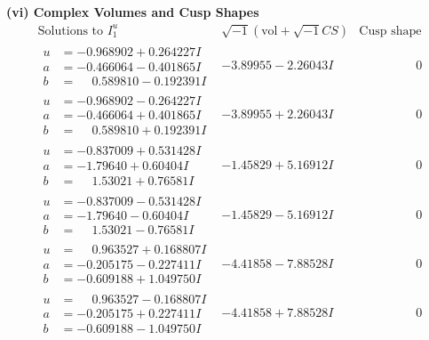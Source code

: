 \documentclass[1p]{elsarticle_modified}
\theoremstyle{definition}
\newcommand{\I}{\sqrt{-1}}
\begin{document}
\newpage\flushleft \textbf{(vi) Complex Volumes and Cusp Shapes}
$$\begin{array}{c|c|c}  
\text{Solutions to }I^u_{1}& \I (\text{vol} + \sqrt{-1}CS) & \text{Cusp shape}\\
 \hline 
\begin{aligned}
u &= -0.968902 + 0.264227 I \\
a &= -0.466064 - 0.401865 I \\
b &= \phantom{-}0.589810 - 0.192391 I\end{aligned}
 & -3.89955 - 2.26043 I & \phantom{-0.000000 } 0 \\ \hline\begin{aligned}
u &= -0.968902 - 0.264227 I \\
a &= -0.466064 + 0.401865 I \\
b &= \phantom{-}0.589810 + 0.192391 I\end{aligned}
 & -3.89955 + 2.26043 I & \phantom{-0.000000 } 0 \\ \hline\begin{aligned}
u &= -0.837009 + 0.531428 I \\
a &= -1.79640 + 0.60404 I \\
b &= \phantom{-}1.53021 + 0.76581 I\end{aligned}
 & -1.45829 + 5.16912 I & \phantom{-0.000000 } 0 \\ \hline\begin{aligned}
u &= -0.837009 - 0.531428 I \\
a &= -1.79640 - 0.60404 I \\
b &= \phantom{-}1.53021 - 0.76581 I\end{aligned}
 & -1.45829 - 5.16912 I & \phantom{-0.000000 } 0 \\ \hline\begin{aligned}
u &= \phantom{-}0.963527 + 0.168807 I \\
a &= -0.205175 - 0.227411 I \\
b &= -0.609188 + 1.049750 I\end{aligned}
 & -4.41858 - 7.88528 I & \phantom{-0.000000 } 0 \\ \hline\begin{aligned}
u &= \phantom{-}0.963527 - 0.168807 I \\
a &= -0.205175 + 0.227411 I \\
b &= -0.609188 - 1.049750 I\end{aligned}
 & -4.41858 + 7.88528 I & \phantom{-0.000000 } 0 \\ \hline\begin{aligned}

\end{aligned}
\end{array}$$
\end{document}
